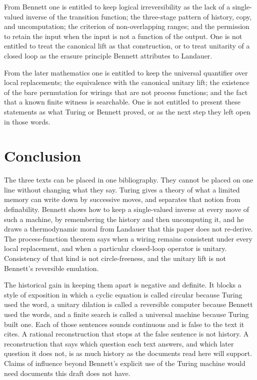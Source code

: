 \documentclass[12pt]{article}
\begin{document}
From Bennett one is entitled to keep logical irreversibility as the lack of a single-valued inverse of the transition function; the three-stage pattern of history, copy, and uncomputation; the criterion of non-overlapping ranges; and the permission to retain the input when the input is not a function of the output. One is not entitled to treat the canonical lift as that construction, or to treat unitarity of a closed loop as the erasure principle Bennett attributes to Landauer.

From the later mathematics one is entitled to keep the universal quantifier over local replacements; the equivalence with the canonical unitary lift; the existence of the bare permutation for wirings that are not process functions; and the fact that a known finite witness is searchable. One is not entitled to present these statements as what Turing or Bennett proved, or as the next step they left open in those words.

\section{Conclusion}
\label{sec:end}

The three texts can be placed in one bibliography. They cannot be placed on one line without changing what they say. Turing gives a theory of what a limited memory can write down by successive moves, and separates that notion from definability. Bennett shows how to keep a single-valued inverse at every move of such a machine, by remembering the history and then uncomputing it, and he draws a thermodynamic moral from Landauer that this paper does not re-derive. The process-function theorem says when a wiring remains consistent under every local replacement, and when a particular closed-loop operator is unitary. Consistency of that kind is not circle-freeness, and the unitary lift is not Bennett's reversible emulation.

The historical gain in keeping them apart is negative and definite. It blocks a style of exposition in which a cyclic equation is called circular because Turing used the word, a unitary dilation is called a reversible computer because Bennett used the words, and a finite search is called a universal machine because Turing built one. Each of those sentences sounds continuous and is false to the text it cites. A rational reconstruction that stops at the false sentence is not history. A reconstruction that says which question each text answers, and which later question it does not, is as much history as the documents read here will support. Claims of influence beyond Bennett's explicit use of the Turing machine would need documents this draft does not have.
\end{document}
